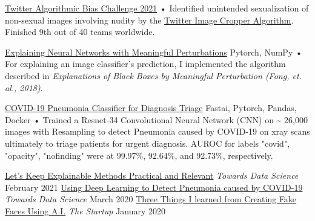 \documentclass[]{awesome-cv}
\begin{document}
\vspace{-10mm}
\begin{cventries}
	\cventry
	{}
	{\href{https://github.com/ajsanjoaquin/twitter-bias-challenge}{Twitter Algorithmic Bias Challenge 2021}}
	{}
	{}
	{• Identified unintended sexualization of non-sexual images involving nudity by the \href{https://github.com/twitter-research/image-crop-analysis}{Twitter Image Cropper Algorithm}. Finished 9th out of 40 teams worldwide.}
	
	\vspace{-1mm}
	\cventry
	{}
	{\href{https://github.com/ajsanjoaquin/mPerturb}{Explaining Neural Networks with Meaningful Perturbations}}
	{Pytorch, NumPy}
	{}
	{• For explaining an image classifier's prediction, I implemented the algorithm described in \textit{Explanations of Black Boxes by Meaningful Perturbation (Fong, et. al., 2018)}.}
	
	\vspace{-1mm}
	\cventry
	{}
	{\href{https://github.com/ajsanjoaquin/COVID-19-Scanner}{COVID-19 Pneumonia Classifier for Diagnosis Triage}}
	{Fastai, Pytorch, Pandas, Docker}
	{}
	{• Trained a Resnet-34 Convolutional Neural Network (CNN) on \textasciitilde{} 26,000 images with Resampling to detect Pneumonia caused by COVID-19 on xray scans ultimately to triage patients for urgent diagnosis. AUROC for labels "covid", "opacity", "nofinding" were at 99.97\%, 92.64\%, and 92.73\%, respectively.}
	\vspace{-4mm}
\end{cventries}
\begin{cvhonors}
	\cvhonor
	{\href{https://towardsdatascience.com/lets-keep-explainable-methods-practical-and-relevant-92e963ce3f64}{Let’s Keep Explainable Methods Practical and Relevant}}
	{\textit{Towards Data Science}}
	{}
	{February 2021}
	\cvhonor
	{\href{https://towardsdatascience.com/using-deep-learning-to-detect-ncov-19-from-x-ray-images-1a89701d1acd}{Using Deep Learning to Detect Pneumonia caused by COVID-19}}
	{\textit{Towards Data Science}}
	{}
	{March 2020}
	\cvhonor
	{\href{https://medium.com/swlh/three-things-i-learned-from-creating-fake-faces-using-ai-fc4c95282a37}{Three Things I learned from Creating Fake Faces Using A.I.}}
	{\textit{The Startup}}
	{}
	{January 2020}
\end{cvhonors}
\vspace{-20mm}
\ 
\end{document}

